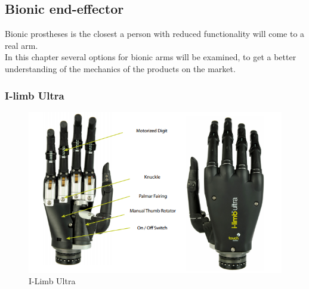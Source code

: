 
\subsection{Bionic end-effector}

Bionic prostheses is the closest a person with reduced functionality will come to a real arm.\\
In this chapter several options for bionic arms will be examined, to get a better understanding of the mechanics of the products on the market.\\

\subsubsection*{I-limb Ultra}

\begin{figure}[H]
    \centering
    \includegraphics[width=12cm]{Figures/Contextual_figures/ProsthesesPics/i-limbultra.png}
    \caption{I-Limb Ultra\cite{I-limbUltra}}
    \label{fig:Ilimb-Ultra}
\end{figure}

